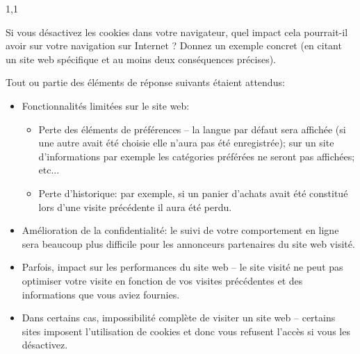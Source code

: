 \documentclass[11pt,a4paper]{exam}
\begin{document}
\begin{spacing}{1,1}
\begin{questions}
        	\question[2] Si vous désactivez les cookies dans votre navigateur, quel impact cela pourrait-il avoir sur votre navigation sur Internet ? Donnez un exemple concret (en citant un site web spécifique et au moins deux conséquences précises).
			\begin{solution}
        		Tout ou partie des éléments de réponse suivants étaient attendus:
        		\begin{itemize}
        			\item Fonctionnalités limitées sur le site web:
        			\begin{itemize}
        				\item Perte des éléments de préférences -- la langue par défaut sera affichée (si une autre avait été choisie elle n'aura pas été enregistrée); sur un site d'informations par exemple les catégories préférées ne seront pas affichées; etc...
        				\item Perte d'historique: par exemple, si un panier d'achats avait été constitué lors d'une visite précédente il aura été perdu.
        			\end{itemize}
        			\item Amélioration de la confidentialité: le suivi de votre comportement en ligne sera beaucoup plus difficile pour les annonceurs partenaires du site web visité. 
        			\item Parfois, impact sur les performances du site web -- le site visité ne peut pas optimiser votre visite en fonction de vos visites précédentes et des informations que vous aviez fournies.
        			\item Dans certains cas, impossibilité complète de visiter un site web -- certains sites imposent l'utilisation de cookies et donc vous refusent l'accès si vous les désactivez.
        		\end{itemize}
        	\end{solution}
        	

\end{questions}
\end{spacing}
\end{document}

